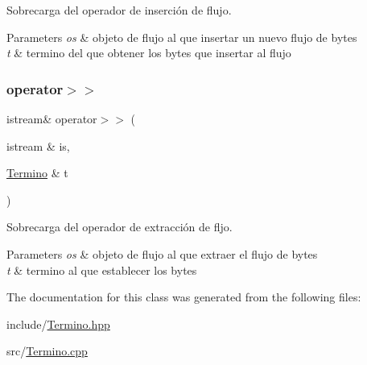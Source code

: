 Sobrecarga del operador de inserción de flujo. 


\begin{DoxyParams}{Parameters}
{\em os} & objeto de flujo al que insertar un nuevo flujo de bytes \\
\hline
{\em t} & termino del que obtener los bytes que insertar al flujo \\
\hline
\end{DoxyParams}
\mbox{\label{class_termino_a076140e7b0c3bcbe8182d5d201725f9f}} 
\subsubsection{\texorpdfstring{operator$>$$>$}{operator>>}}
{\footnotesize\ttfamily istream\& operator$>$$>$ (\begin{DoxyParamCaption}\item[{istream \&}]{is,  }\item[{\mbox{\hyperlink{class_termino}{Termino}} \&}]{t }\end{DoxyParamCaption})\hspace{0.3cm}{\ttfamily [friend]}}



Sobrecarga del operador de extracción de fljo. 


\begin{DoxyParams}{Parameters}
{\em os} & objeto de flujo al que extraer el flujo de bytes \\
\hline
{\em t} & termino al que establecer los bytes \\
\hline
\end{DoxyParams}


The documentation for this class was generated from the following files\+:\begin{DoxyCompactItemize}
\item 
include/\mbox{\hyperlink{_termino_8hpp}{Termino.\+hpp}}\item 
src/\mbox{\hyperlink{_termino_8cpp}{Termino.\+cpp}}\end{DoxyCompactItemize}
